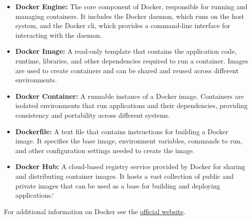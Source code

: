 \begin{itemize}
  \item \textbf{Docker Engine:} The core component of Docker, responsible for running and managing containers. It includes the Docker daemon, which runs on the host system, and the Docker \gls{cli}, which provides a command-line interface for interacting with the daemon.
  \item \textbf{Docker Image:} A read-only template that contains the application code, runtime, libraries, and other dependencies required to run a container. Images are used to create containers and can be shared and reused across different environments.
  \item \textbf{Docker Container:} A runnable instance of a Docker image. Containers are isolated environments that run applications and their dependencies, providing consistency and portability across different systems.
  \item \textbf{Dockerfile:} A text file that contains instructions for building a Docker image. It specifies the base image, environment variables, commands to run, and other configuration settings needed to create the image.
  \item \textbf{Docker Hub:} A cloud-based registry service provided by Docker for sharing and distributing container images. It hosts a vast collection of public and private images that can be used as a base for building and deploying applications.`
\end{itemize}
For additional information on Docker see the \href{https://www.docker.com/}{official website}.
